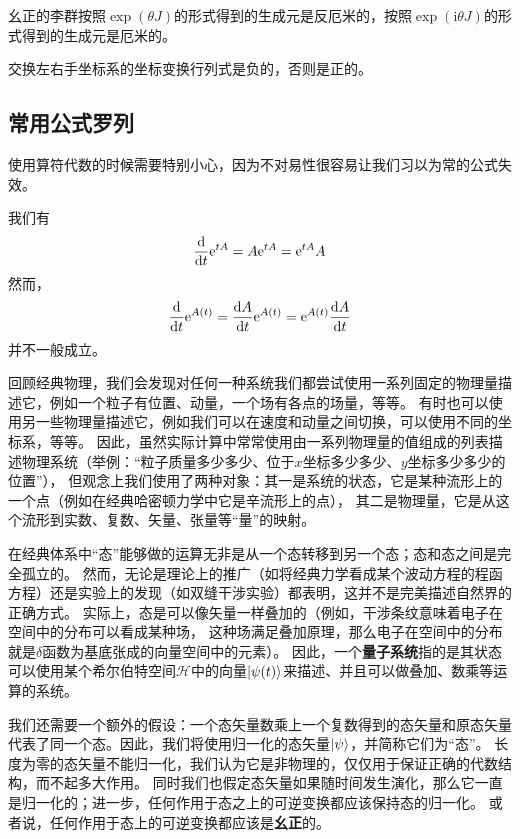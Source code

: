 \documentclass[UTF8, a4paper]{ctexart}
\newcommand*{\ii}{\mathrm{i}}
\newcommand*{\ee}{\mathrm{e}}
\begin{document}
幺正的李群按照$\exp(\theta J)$的形式得到的生成元是反厄米的，按照$\exp(\ii \theta J)$的形式得到的生成元是厄米的。

交换左右手坐标系的坐标变换行列式是负的，否则是正的。

\subsection{常用公式罗列}

使用算符代数的时候需要特别小心，因为不对易性很容易让我们习以为常的公式失效。


我们有
\[
    \dv{t} \ee^{t A} = A \ee^{t A} = \ee^{t A} A
\]
然而，
\[
    \dv{t} \ee^{A(t)} = \dv{A}{t} \ee^{A(t)} = \ee^{A(t)} \dv{A}{t}
\]
并不一般成立。

回顾经典物理，我们会发现对任何一种系统我们都尝试使用一系列固定的物理量描述它，例如一个粒子有位置、动量，一个场有各点的场量，等等。
有时也可以使用另一些物理量描述它，例如我们可以在速度和动量之间切换，可以使用不同的坐标系，等等。
因此，虽然实际计算中常常使用由一系列物理量的值组成的列表描述物理系统（举例：“粒子质量多少多少、位于$x$坐标多少多少、$y$坐标多少多少的位置”），
但观念上我们使用了两种对象：其一是系统的状态，它是某种流形上的一个点（例如在经典哈密顿力学中它是辛流形上的点），
其二是物理量，它是从这个流形到实数、复数、矢量、张量等“量”的映射。

在经典体系中“态”能够做的运算无非是从一个态转移到另一个态；态和态之间是完全孤立的。
然而，无论是理论上的推广（如将经典力学看成某个波动方程的程函方程）还是实验上的发现（如双缝干涉实验）都表明，这并不是完美描述自然界的正确方式。
实际上，态是可以像矢量一样叠加的（例如，干涉条纹意味着电子在空间中的分布可以看成某种场，
这种场满足叠加原理，那么电子在空间中的分布就是$\delta$函数为基底张成的向量空间中的元素）。
因此，一个\textbf{量子系统}指的是其状态可以使用某个希尔伯特空间$\mathcal{H}$中的向量$\ket{\psi(t)}$来描述、并且可以做叠加、数乘等运算的系统。

我们还需要一个额外的假设：一个态矢量数乘上一个复数得到的态矢量和原态矢量代表了同一个态。因此，我们将使用归一化的态矢量$\ket{\psi}$，并简称它们为“态”。
长度为零的态矢量不能归一化，我们认为它是非物理的，仅仅用于保证正确的代数结构，而不起多大作用。
同时我们也假定态矢量如果随时间发生演化，那么它一直是归一化的；进一步，任何作用于态之上的可逆变换都应该保持态的归一化。
或者说，任何作用于态上的可逆变换都应该是\textbf{幺正}的。
\end{document}
